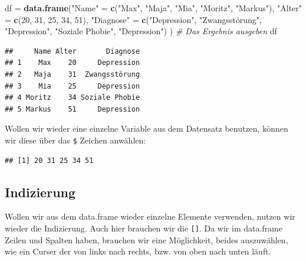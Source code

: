 \documentclass[
]{book}
\newenvironment{Shaded}{\begin{snugshade}}{\end{snugshade}}
\newcommand{\CommentTok}[1]{\textcolor[rgb]{0.56,0.35,0.01}{\textit{#1}}}
\newcommand{\DecValTok}[1]{\textcolor[rgb]{0.00,0.00,0.81}{#1}}
\newcommand{\FunctionTok}[1]{\textcolor[rgb]{0.13,0.29,0.53}{\textbf{#1}}}
\newcommand{\NormalTok}[1]{#1}
\newcommand{\OtherTok}[1]{\textcolor[rgb]{0.56,0.35,0.01}{#1}}
\newcommand{\SpecialCharTok}[1]{\textcolor[rgb]{0.81,0.36,0.00}{\textbf{#1}}}
\newcommand{\StringTok}[1]{\textcolor[rgb]{0.31,0.60,0.02}{#1}}
\begin{document}
\begin{Shaded}
\begin{Highlighting}[]
\NormalTok{df }\OtherTok{=} \FunctionTok{data.frame}\NormalTok{(}\StringTok{"Name"} \OtherTok{=} \FunctionTok{c}\NormalTok{(}\StringTok{"Max"}\NormalTok{, }\StringTok{"Maja"}\NormalTok{, }\StringTok{"Mia"}\NormalTok{, }\StringTok{"Moritz"}\NormalTok{, }\StringTok{"Markus"}\NormalTok{),}
                \StringTok{"Alter"} \OtherTok{=} \FunctionTok{c}\NormalTok{(}\DecValTok{20}\NormalTok{, }\DecValTok{31}\NormalTok{, }\DecValTok{25}\NormalTok{, }\DecValTok{34}\NormalTok{, }\DecValTok{51}\NormalTok{),}
                \StringTok{"Diagnose"} \OtherTok{=} \FunctionTok{c}\NormalTok{(}\StringTok{"Depression"}\NormalTok{, }\StringTok{"Zwangsstörung"}\NormalTok{, }\StringTok{"Depression"}\NormalTok{, }\StringTok{"Soziale Phobie"}\NormalTok{, }\StringTok{"Depression"}\NormalTok{)}
\NormalTok{                )}
\CommentTok{\# Das Ergebnis ausgeben}
\NormalTok{df}
\end{Highlighting}
\end{Shaded}

\begin{verbatim}
##     Name Alter       Diagnose
## 1    Max    20     Depression
## 2   Maja    31  Zwangsstörung
## 3    Mia    25     Depression
## 4 Moritz    34 Soziale Phobie
## 5 Markus    51     Depression
\end{verbatim}

Wollen wir wieder eine einzelne Variable aus dem Datensatz benutzen, können wir diese über das \texttt{\$} Zeichen anwählen:

\begin{Shaded}
\end{Shaded}

\begin{verbatim}
## [1] 20 31 25 34 51
\end{verbatim}

\subsection{Indizierung}\label{indizierung}

Wollen wir aus dem data.frame wieder einzelne Elemente verwenden, nutzen wir wieder die Indizierung. Auch hier brauchen wir die \texttt{{[}{]}}. Da wir im data.frame Zeilen und Spalten haben, brauchen wir eine Möglichkeit, beides auszuwählen, wie ein Curser der von links nach rechts, bzw. von oben nach unten läuft.
\end{document}
